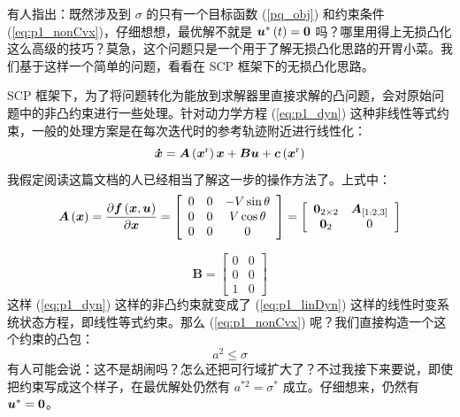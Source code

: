 \documentclass{article}
\numberwithin{equation}{section}
\begin{document}
有人指出：既然涉及到 $\sigma$ 的只有一个目标函数 (\ref{pq_obj}) 和约束条件 (\ref{eq:p1_nonCvx})，仔细想想，最优解不就是 $\bm{u}^*\left(t\right) = {\bf{0}}$ 吗？哪里用得上无损凸化这么高级的技巧？莫急，这个问题只是一个用于了解无损凸化思路的开胃小菜。我们基于这样一个简单的问题，看看在 SCP 框架下的无损凸化思路。

SCP 框架下，为了将问题转化为能放到求解器里直接求解的凸问题，会对原始问题中的非凸约束进行一些处理。针对动力学方程 (\ref{eq:p1_dyn}) 这种非线性等式约束，一般的处理方案是在每次迭代时的参考轨迹附近进行线性化：
\begin{equation}
{\bm{\dot x}} = {\bm{A}}\left( {{{\bm{x}}^{\rm{r}}}} \right){\bm{x}} + {\bm{Bu}} + {\bm{c}}\left( {{{\bm{x}}^{\rm{r}}}} \right)
\label{eq:p1_linDyn}
\end{equation}
我假定阅读这篇文档的人已经相当了解这一步的操作方法了。上式中：
\begin{equation}
\label{p1_1_A}
{\bm{A}}\left( {\bm{x}} \right) = \frac{{\partial {\bm{f}}\left( {{\bm{x}},{\bm{u}}} \right)}}{{\partial {\bm{x}}}} = \left[ {\begin{array}{*{20}{c}}
0&0&{ - V\sin \theta }\\
0&0&{V\cos \theta }\\
0&0&0
\end{array}} \right] = \left[ {\begin{array}{*{20}{c}}
{{{\bf{0}}_{2 \times 2}}}&{{{\bm{A}}_{\left[ {1:2,3} \right]}}}\\
{{{\bf{0}}_2}}&0
\end{array}} \right]
\end{equation}

\begin{equation}
\label{p1_1_B}
{\bm{B}} = \left[ {\begin{array}{*{20}{c}}
0&0\\
0&0\\
1&0
\end{array}} \right]
\end{equation}
这样 (\ref{eq:p1_dyn}) 这样的非凸约束就变成了 (\ref{eq:p1_linDyn}) 这样的线性时变系统状态方程，即线性等式约束。那么 (\ref{eq:p1_nonCvx}) 呢？我们直接构造一个这个约束的凸包：
\begin{equation}
{a^2} \le \sigma
\label{eq:p1_cvxRelax}
\end{equation}
有人可能会说：这不是胡闹吗？怎么还把可行域扩大了？不过我接下来要说，即使把约束写成这个样子，在最优解处仍然有 $a^{*2} = \sigma^*$ 成立。仔细想来，仍然有 $\bm{u}^* = {\bf{0}}$。
\end{document}
